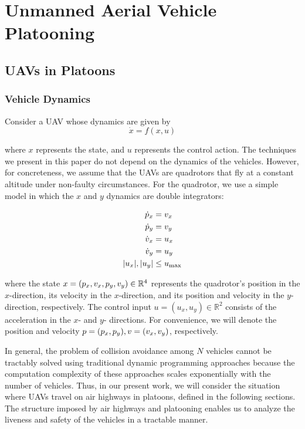 \section{Unmanned Aerial Vehicle Platooning \label{sec:platooning}}
\subsection{UAVs in Platoons}
\subsubsection{Vehicle Dynamics}
Consider a UAV whose dynamics are given by
\begin{equation}
\dot{x} = f(x,u)
\end{equation}

\noindent where $x$ represents the state, and $u$ represents the control action. The techniques we present in this paper do not depend on the dynamics of the vehicles. However, for concreteness, we assume that the UAVs are quadrotors that fly at a constant altitude under non-faulty circumstances. For the quadrotor, we use a simple model in which the $x$ and $y$ dynamics are double integrators:

\begin{equation} \label{eq:dyn}
\begin{aligned}
\dot{p}_x &= v_x \\
\dot{p}_y &= v_y  \\
\dot{v}_x &= u_x \\
\dot{v}_y &= u_y \\
|u_x|,|u_y| &\le u_\text{max}
\end{aligned}
\end{equation}

\noindent where the state $x=(p_x, v_x, p_y, v_y)\in\mathbb{R}^4$ represents the quadrotor's position in the $x$-direction, its velocity in the $x$-direction, and its position and velocity in the $y$-direction, respectively. The control input $u = (u_x, u_y)\in\mathbb{R}^2$ consists of the acceleration in the $x$- and $y$- directions. For convenience, we will denote the position and velocity $p=(p_x, p_y),v=(v_x,v_y)$, respectively. 

In general, the problem of collision avoidance among $N$ vehicles cannot be tractably solved using traditional dynamic programming approaches because the computation complexity of these approaches scales exponentially with the number of vehicles. Thus, in our present work, we will consider the situation where UAVs travel on air highways in platoons, defined in the following sections. The structure imposed by air highways and platooning enables us to analyze the liveness and safety of the vehicles in a tractable manner.

